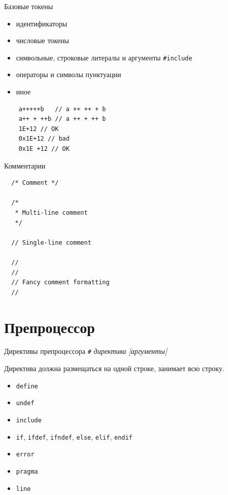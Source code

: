 \documentclass[unknownkeysallowed,xcolor=table]{beamer}
\begin{document}
\begin{frame}[fragile]{Базовые токены}
  \begin{itemize}
    \item идентификаторы
    \item числовые токены
    \item символьные, строковые литералы и аргументы \lstinline{#include}
    \item операторы и символы пунктуации
    \item иное
  \end{itemize}
  \vspace{1em}
  \begin{lstlisting}
    a+++++b   // a ++ ++ + b
    a++ + ++b // a ++ + ++ b
    1E+12 // OK
    0x1E+12 // bad
    0x1E +12 // OK
  \end{lstlisting}
\end{frame}

\begin{frame}[fragile]{Комментарии}
  \begin{lstlisting}
  /* Comment */

  /*
   * Multi-line comment
   */

  // Single-line comment

  //
  //
  // Fancy comment formatting
  //
  \end{lstlisting}
\end{frame}

\section{Препроцессор}

\begin{frame}[fragile]{Директивы препроцессора}
  \lstinline{#} \emph{директива [аргументы]}

  \vspace{1em}

  Директива должна размещаться на одной строке, занимает всю строку.

  \begin{itemize}
    \item \lstinline{define}
    \item \lstinline{undef}
    \item \lstinline{include}
    \item \lstinline{if}, \lstinline{ifdef}, \lstinline{ifndef}, \lstinline{else}, \lstinline{elif}, \lstinline{endif}
    \item \lstinline{error}
    \item \lstinline{pragma}
    \item \lstinline{line}
  \end{itemize}
\end{frame}
\end{document}
